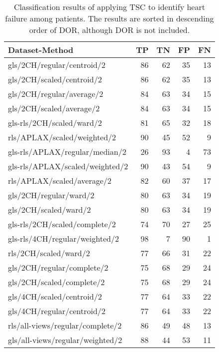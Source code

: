 \begin{longtable}{lrrrr}
    \caption{Classification results of applying TSC to identify heart failure among patients. The results are sorted in descending order of DOR, although DOR is not included.}
    \label{tab:tsc_hf_raw_results}\\
    \hline
    Dataset-Method                            & TP & TN & FP & FN \\
    \hline 
    gls/2CH/regular/centroid/2                & 86 & 62 & 35 & 13 \\
    gls/2CH/scaled/centroid/2                 & 86 & 62 & 35 & 13 \\
    gls/2CH/regular/average/2                 & 84 & 63 & 34 & 15 \\
    gls/2CH/scaled/average/2                  & 84 & 63 & 34 & 15 \\
    gls-rls/2CH/scaled/ward/2                 & 81 & 65 & 32 & 18 \\
    rls/APLAX/scaled/weighted/2               & 90 & 45 & 52 &  9 \\
    gls-rls/APLAX/regular/median/2            & 26 & 93 &  4 & 73 \\
    gls-rls/APLAX/scaled/weighted/2           & 90 & 43 & 54 &  9 \\
    rls/APLAX/scaled/average/2                & 82 & 60 & 37 & 17 \\
    gls/2CH/regular/ward/2                    & 80 & 63 & 34 & 19 \\
    gls/2CH/scaled/ward/2                     & 80 & 63 & 34 & 19 \\
    gls-rls/2CH/scaled/complete/2             & 74 & 70 & 27 & 25 \\
    gls-rls/4CH/regular/weighted/2            & 98 &  7 & 90 &  1 \\
    rls/2CH/scaled/ward/2                     & 77 & 66 & 31 & 22 \\
    gls/2CH/regular/complete/2                & 75 & 68 & 29 & 24 \\
    gls/2CH/scaled/complete/2                 & 75 & 68 & 29 & 24 \\
    gls/4CH/scaled/centroid/2                 & 77 & 64 & 33 & 22 \\
    gls/4CH/regular/centroid/2                & 77 & 64 & 33 & 22 \\
    rls/all-views/regular/complete/2          & 86 & 49 & 48 & 13 \\
    gls/all-views/regular/weighted/2          & 88 & 44 & 53 & 11 \\

\end{longtable}
